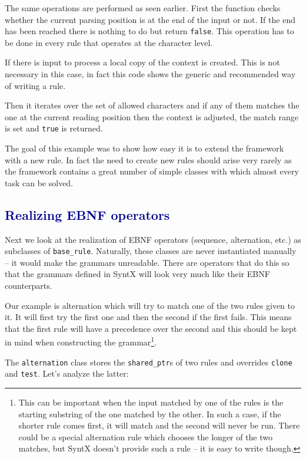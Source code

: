 \documentclass[12pt]{article}
\newcommand{\usubsec}[2]{\subsection*{\textcolor{darkblue}{#1}}\label{subsec:#2}\addcontentsline{toc}{subsection}{#1}}
\begin{document}
The same operations are performed as seen earlier. First the function checks whether the current parsing
position is at the end of the input or not. If the end has been reached there is nothing to do but return
\texttt{false}. This operation has to be done in every rule that operates at the character level.

If there is input to process a local copy of the context is created. This is not necessary in this case, in
fact this code shows the generic and recommended way of writing a rule.

Then it iterates over the set of allowed characters and if any of them matches the one at the current reading
position then the context is adjusted, the match range is set and \texttt{true} is returned.

The goal of this example was to show how easy it is to extend the framework with a new rule. In fact the
need to create new rules should arise very rarely as the framework contains a great number of simple classes
with which almost every task can be solved.

\usubsec{Realizing EBNF operators}{ebnfoperators}
Next we look at the realization of EBNF operators (sequence, alternation, etc.) as subclasses of
\texttt{base\_rule}. Naturally, these classes are never instantiated manually -- it would make the grammars
unreadable. There are operators that do this so that the grammars defined in SyntX will look very much like
their EBNF counterparts.

Our example is alternation which will try to match one of the two rules given to it. It will first try the
first one and then the second if the first fails. This means that the first rule will have a precedence over
the second and this should be kept in mind when constructing the grammar\footnote{This can be important when
the input matched by one of the rules is the starting substring of the one matched by the other. In such a
case, if the shorter rule comes first, it will match and the second will never be run. There could be a special
alternation rule which chooses the longer of the two matches, but SyntX doesn't provide such a rule -- it is easy to
write though.}.

The \texttt{alternation} class stores the \texttt{shared\_ptr}s of two rules and overrides \texttt{clone} and
\texttt{test}. Let's analyze the latter:
\end{document}
